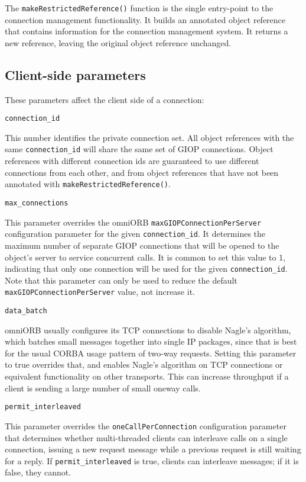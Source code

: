 \documentclass[11pt,oneside,a4paper]{book}
\makeatletter
\newcommand{\code}[1]{\texttt{#1}}
\newcommand{\op}[1]{\texttt{#1()}}
\newcommand{\confoptnd}[1]
  {\vspace{\baselineskip}\par\noindent\code{#1}}
\renewcommand{\confoptnd}[1]
  {\vspace{\baselineskip}\par\noindent\code{#1}\\[-1ex]\@afterheading}
\makeatother
\begin{document}
The \op{makeRestrictedReference} function is the single entry-point to
the connection management functionality. It builds an annotated object
reference that contains information for the connection management
system. It returns a new reference, leaving the original object
reference unchanged.

\subsection{Client-side parameters}

These parameters affect the client side of a connection:

\confoptnd{connection\_id}

This number identifies the private connection set. All object
references with the same \code{connection\_id} will share the same set
of GIOP connections. Object references with different connection ids
are guaranteed to use different connections from each other, and from
object references that have not been annotated with
\op{makeRestrictedReference}.

\confoptnd{max\_connections}

This parameter overrides the omniORB \code{maxGIOPConnectionPerServer}
configuration parameter for the given \code{connection\_id}. It
determines the maximum number of separate GIOP connections that will
be opened to the object's server to service concurrent calls. It is
common to set this value to 1, indicating that only one connection
will be used for the given \code{connection\_id}. Note that this
parameter can only be used to reduce the default
\code{maxGIOPConnectionPerServer} value, not increase it.

\confoptnd{data\_batch}

omniORB usually configures its TCP connections to disable Nagle's
algorithm, which batches small messages together into single IP
packages, since that is best for the usual CORBA usage pattern of
two-way requests. Setting this parameter to true overrides that, and
enables Nagle's algorithm on TCP connections or equivalent
functionality on other transports. This can increase throughput if a
client is sending a large number of small oneway calls.

\confoptnd{permit\_interleaved}

This parameter overrides the \code{oneCallPerConnection} configuration
parameter that determines whether multi-threaded clients can
interleave calls on a single connection, issuing a new request message
while a previous request is still waiting for a reply. If
\code{permit\_interleaved} is true, clients can interleave messages;
if it is false, they cannot.
\end{document}
